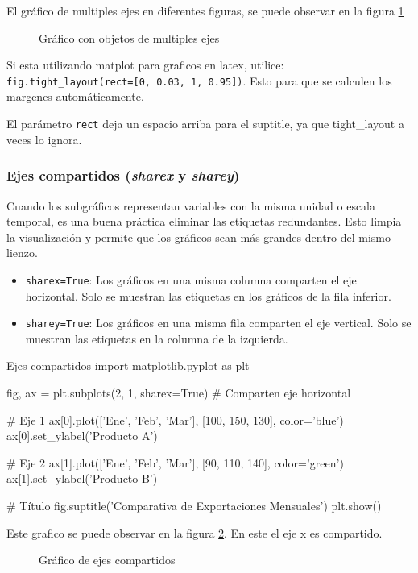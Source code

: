 El gráfico de multiples ejes en diferentes figuras, se puede observar en la figura \ref{fig:grafico_objeto_4eje}

\begin{figure}[ht]
    \centering
     
    \caption{Gráfico con objetos de multiples ejes}
    \label{fig:grafico_objeto_4eje}
\end{figure}

\begin{nota}
    Si esta utilizando matplot para graficos en latex, utilice: \texttt{fig.tight\_layout(rect=[0, 0.03, 1, 0.95])}. Esto para que se calculen los margenes automáticamente.
    
    El parámetro \texttt{rect} deja un espacio arriba para el suptitle, ya que tight\_layout a veces lo ignora.
\end{nota}

\subsubsection{Ejes compartidos (\textit{sharex} y \textit{sharey})}

Cuando los subgráficos representan variables con la misma unidad o escala temporal, es una buena práctica eliminar las etiquetas redundantes. Esto limpia la visualización y permite que los gráficos sean más grandes dentro del mismo lienzo.

\begin{itemize}
\item \texttt{sharex=True}: Los gráficos en una misma columna comparten el eje horizontal. Solo se muestran las etiquetas en los gráficos de la fila inferior.
\item \texttt{sharey=True}: Los gráficos en una misma fila comparten el eje vertical. Solo se muestran las etiquetas en la columna de la izquierda.
\end{itemize}

\begin{pycode}{Ejes compartidos}
import matplotlib.pyplot as plt

fig, ax = plt.subplots(2, 1, sharex=True) # Comparten eje horizontal

# Eje 1
ax[0].plot(['Ene', 'Feb', 'Mar'], [100, 150, 130], color='blue')
ax[0].set_ylabel('Producto A')

# Eje 2
ax[1].plot(['Ene', 'Feb', 'Mar'], [90, 110, 140], color='green')
ax[1].set_ylabel('Producto B')

# Título
fig.suptitle('Comparativa de Exportaciones Mensuales')
plt.show()
\end{pycode}

Este grafico se puede observar en la figura \ref{fig:grafico_objeto_ejes_compartidos}. En este el eje x es compartido.

\begin{figure}[ht]
    \centering
     
    \caption{Gráfico de ejes compartidos}
    \label{fig:grafico_objeto_ejes_compartidos}
\end{figure}

